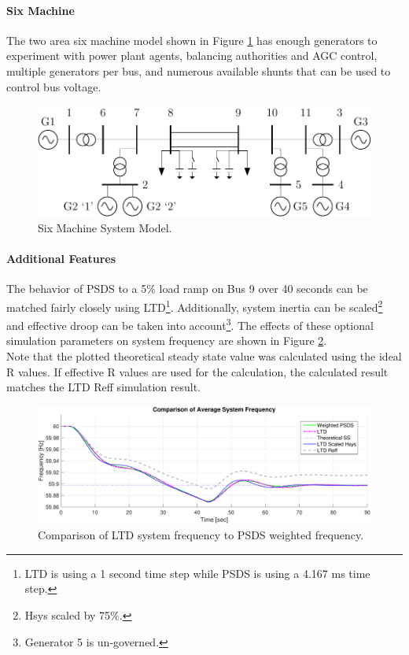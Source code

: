 \documentclass[12pt]{article}
\begin{document}
\pagebreak
\paragraph{Six Machine} The two area six machine model shown in Figure \ref{system} has enough generators to experiment with power plant agents, balancing authorities and AGC control, multiple generators per bus, and numerous available shunts that can be used to control bus voltage.

\newcommand{\figW}{1}
\begin{figure}[h!]
	\centering
	\includegraphics[width=\figW\linewidth]{../../models/sixMachine/sixMachine}\vspace{-.5em}
	\caption{Six Machine System Model.}
	\label{system}		 
\end{figure}%


\paragraph{Additional Features} The behavior of PSDS to a 5\% load ramp on Bus 9 over 40 seconds can be matched fairly closely using LTD\footnote{LTD is using a 1 second time step while PSDS is using a 4.167 ms time step.}. Additionally, system inertia can be scaled\footnote{Hsys scaled by 75\%.} and effective droop can be taken into account\footnote{Generator 5 is un-governed.}. The effects of these optional simulation parameters on system frequency are shown in Figure \ref{featureComp}. 
\\

Note that the plotted theoretical steady state value was calculated using the ideal R values. If effective R values are used for the calculation, the calculated result matches the LTD Reff simulation result.

\begin{figure}[h!]
	\centering
	\includegraphics[width=\figW\linewidth]{HReffCompRamp}\vspace{-.5em}
	\caption{Comparison of LTD system frequency to PSDS weighted frequency.}
	\label{featureComp}		 
\end{figure}%
\end{document}
